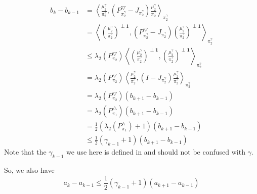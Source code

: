 \documentclass{article}
\def\<{\left\langle}
\def\>{\right\rangle}
\begin{document}
\begin{align*}
  b_{k} - b_{k-1}
  &= \<\frac{\mu_2^\gamma}{\pi_2^\gamma}, (P_{\pi_2^\gamma}^{\bigtriangledown} - J_{\pi_2^\gamma})\frac{\mu_2^\gamma}{\pi_2^\gamma}\>_{\pi_2^\gamma} \\
  &= \<(\frac{\mu_2^\gamma}{\pi_2^\gamma})^{\perp \mathbf{1}}, (P_{\pi_2^\gamma}^{\bigtriangledown} - J_{\pi_2^\gamma})(\frac{\mu_2^\gamma}{\pi_2^\gamma})^{\perp \mathbf{1}}\>_{\pi_2^\gamma} \\
  &\leq \lambda_2(P_{\pi_2}^\bigtriangledown)\<(\frac{\mu_2^\gamma}{\pi_2^\gamma})^{\perp \mathbf{1}}, (\frac{\mu_2^\gamma}{\pi_2^\gamma})^{\perp \mathbf{1}}\>_{\pi_2^\gamma} \\
  &= \lambda_2(P_{\pi_2}^\bigtriangledown)\<\frac{\mu_2^\gamma}{\pi_2^\gamma}, (I - J_{\pi_2^\gamma}) \frac{\mu_2^\gamma}{\pi_2^\gamma}\>_{\pi_2^\gamma} \\
  &= \lambda_2(P_{\pi_2}^\bigtriangledown) (b_{k+1} - b_{k-1}) \\
  &= \lambda_2(P_{\pi_1}^\bigtriangleup) (b_{k+1} - b_{k-1}) \\
  &= \frac{1}{2}(\lambda_2(P_{\pi_1}^\land) + 1) (b_{k+1} - b_{k-1}) \\
  &\leq \frac{1}{2}(\gamma_{k-1} + 1) (b_{k+1} - b_{k-1})
\end{align*}
Note that the $\gamma_{k-1}$ we use here is defined in \cite{alev2020improved} and should not be confused with $\gamma$.

So, we also have
\[a_k - a_{k-1} \leq \frac{1}{2}(\gamma_{k-1} + 1) (a_{k+1} - a_{k-1})\]

\clearpage


\end{document}
